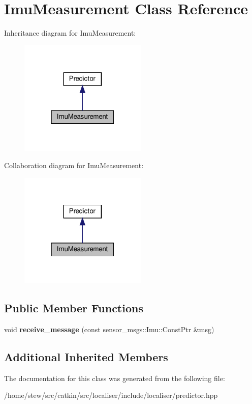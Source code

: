 \hypertarget{classImuMeasurement}{}\section{Imu\+Measurement Class Reference}
\label{classImuMeasurement}


Inheritance diagram for Imu\+Measurement\+:
\nopagebreak
\begin{figure}[H]
\begin{center}
\leavevmode
\includegraphics[width=172pt]{classImuMeasurement__inherit__graph}
\end{center}
\end{figure}


Collaboration diagram for Imu\+Measurement\+:
\nopagebreak
\begin{figure}[H]
\begin{center}
\leavevmode
\includegraphics[width=172pt]{classImuMeasurement__coll__graph}
\end{center}
\end{figure}
\subsection*{Public Member Functions}
\begin{DoxyCompactItemize}
\item 
\mbox{\label{classImuMeasurement_a66fbe1376e888c8dc7d4062f2ec1dfdd}} 
void {\bfseries receive\+\_\+message} (const sensor\+\_\+msgs\+::\+Imu\+::\+Const\+Ptr \&msg)
\end{DoxyCompactItemize}
\subsection*{Additional Inherited Members}


The documentation for this class was generated from the following file\+:\begin{DoxyCompactItemize}
\item 
/home/stew/src/catkin/src/localiser/include/localiser/predictor.\+hpp\end{DoxyCompactItemize}
